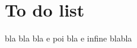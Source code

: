 \documentclass[10pt,a4paper]{article}
\begin{document}
\section{To do list}
bla bla bla
e poi bla
e infine blabla
\end{document}
